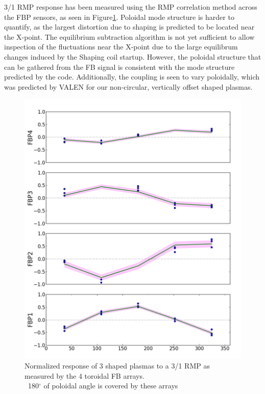 \documentclass[aps,prl,twocolumn,superscriptaddress,groupedaddress]{revtex4}  %
\begin{document}
3/1 RMP response has been measured using the RMP correlation method across the FBP sensors, as seen in Figure\ref{RMP_response}.  Poloidal mode structure is harder to quantify, as the largest distortion due to shaping is predicted to be located near the X-point.  The equilibrium subtraction algorithm is not yet sufficient to allow inspection of the fluctuations near the X-point due to the large equilibrum changes induced by the Shaping coil startup.  However, the poloidal structure that can be gathered from the FB signal is consistent with the mode structure predicted by the code.  Additionally, the coupling is seen to vary poloidally, which was predicted by VALEN for our non-circular, vertically offset shaped plasmas.
	
\begin{figure}[htb]
	\centering
\includegraphics[scale=.35]{../Plots/response_good_plot2_84573_4_7.png}\caption{Normalized response of 3 shaped plasmas to a 3/1 RMP as measured by the 4 toroidal FB arrays.\\   ~180$^{\circ}$ of poloidal angle is covered by these arrays}
	\label{RMP_response}
	\end{figure}
	
\end{document}
